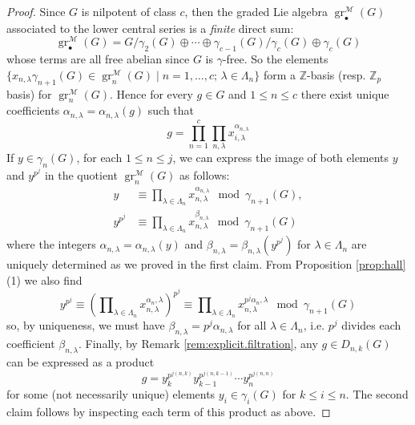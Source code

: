 \documentclass[10pt,a4paper]{amsart}
\newcommand{\Z}{\mathbb Z}
\newcommand{\grM}{\operatorname{gr}^{\mathscr M}}
\begin{document}
\begin{proof}
    Since $G$ is nilpotent of class $c$, then the graded Lie algebra $\grM_\bullet(G)$ associated to the lower central series is a \emph{finite} direct sum:
    \[
        \grM_\bullet(G) = G/\gamma_2(G) \oplus \cdots \oplus \gamma_{c-1}(G)/\gamma_c(G) \oplus \gamma_c(G)
    \]
    whose terms are all free abelian since $G$ is $\gamma$-free. So the elements $\{ x_{n, \lambda}\gamma_{n+1}(G) \in \grM_n(G) \mid n = 1, \dots, c; \, \lambda \in \Lambda_n\}$ form a $\Z$-basis (resp. $\Z_p$ basis) for $\grM_n(G)$.
    Hence for every $g \in G$ and $1 \leq n \leq c$ there exist unique coefficients $\alpha_{n, \lambda} = \alpha_{n, \lambda}(g)$ such that
    \[
        g = \prod_{n=1}^c\prod_{n, \lambda} x_{i, \lambda}^{\alpha_{n, \lambda}}
    \]
\noindent
    If $y \in \gamma_n(G)$, for each $1 \leq n \leq j$, we can express the image of both elements $y$ and $y^{p^j}$ in the quotient $\grM_n(G)$ as follows:
    \begin{align*}
        y &\equiv \prod\nolimits_{\lambda \in \Lambda_n} x_{n, \lambda}^{\alpha_{n, \lambda}} \mod \gamma_{n+1}(G), \\
        y^{p^j} &\equiv \prod\nolimits_{\lambda \in \Lambda_n} x_{n, \lambda}^{\beta_{n, \lambda}} \mod \gamma_{n+1}(G)
    \end{align*}
    where the integers $\alpha_{n, \lambda} = \alpha_{n, \lambda}(y)$ and $\beta_{n, \lambda} = \beta_{n, \lambda}(y^{p^j})$ for $\lambda \in \Lambda_n$ are uniquely determined as we proved in the first claim.
    From Proposition \ref{prop:hall} (1) we also find
    \[
        y^{p^j} \equiv \left( \prod\nolimits_{\lambda\in\Lambda_n} x_{n,\lambda}^{\alpha_n,\lambda}\right)^{p^j} \equiv \prod\nolimits_{\lambda\in\Lambda_n} x_{n,\lambda}^{p^j\alpha_n,\lambda} \mod \gamma_{n+1}(G)
    \]
    so, by uniqueness, we must have $\beta_{n, \lambda} = p^j \alpha_{n, \lambda}$ for all $\lambda \in \Lambda_n$, i.e. $p^j$ divides each coefficient $\beta_{n, \lambda}$.
\noindent
    Finally, by Remark \ref{rem:explicit.filtration}, any $g \in D_{n, k}(G)$ can be expressed as a product
    \[
        g = y_k^{p^{j(n, k)}} y_{k-1}^{p^{j(n, k-1)}} \cdots y_{n}^{p^{j(n, n)}}
    \]
    for some (not necessarily unique) elements $y_i \in \gamma_i(G)$ for $k \leq i \leq n$. The second claim follows by inspecting each term of this product as above. 
\end{proof}
\end{document}
